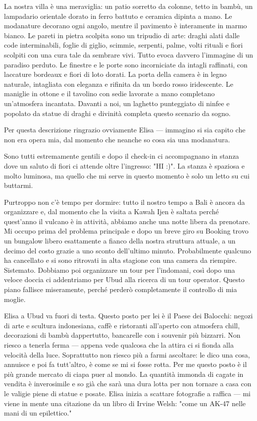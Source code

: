 La nostra villa è una meraviglia: un patio sorretto da colonne, tetto in bambù, un lampadario orientale dorato in ferro battuto e ceramica dipinta a mano. Le modanature decorano ogni angolo, mentre il pavimento è interamente in marmo bianco. Le pareti in pietra scolpita sono un tripudio di arte: draghi alati dalle code interminabili, foglie di giglio, scimmie, serpenti, palme, volti rituali e fiori scolpiti con una cura tale da sembrare vivi. Tutto evoca davvero l'immagine di un paradiso perduto. Le finestre e le porte sono incorniciate da intagli raffinati, con laccature bordeaux e fiori di loto dorati. La porta della camera è in legno naturale, intagliata con eleganza e rifinita da un bordo rosso iridescente. Le maniglie in ottone e il tavolino con sedie lavorate a mano completano un'atmosfera incantata. Davanti a noi, un laghetto punteggiato di ninfee e popolato da statue di draghi e divinità completa questo scenario da sogno.

Per questa descrizione ringrazio ovviamente Elisa — immagino si sia capito che non era opera mia, dal momento che neanche so cosa sia una modanatura.

Sono tutti estremamente gentili e dopo il check-in ci accompagnano in stanza dove un saluto di fiori ci attende oltre l'ingresso: "HI :)". La stanza è spaziosa e molto luminosa, ma quello che mi serve in questo momento è solo un letto su cui buttarmi.

Purtroppo non c'è tempo per dormire: tutto il nostro tempo a Bali è ancora da organizzare e, dal momento che la visita a Kawah Ijen è saltata perché quest'anno il vulcano è in attività, abbiamo anche una notte libera da prenotare. Mi occupo prima del problema principale e dopo un breve giro su Booking trovo un bungalow libero esattamente a fianco della nostra struttura attuale, a un decimo del costo grazie a uno sconto dell'ultimo minuto. Probabilmente qualcuno ha cancellato e si sono ritrovati in alta stagione con una camera da riempire. Sistemato. Dobbiamo poi organizzare un tour per l'indomani, così dopo una veloce doccia ci addentriamo per Ubud alla ricerca di un tour operator. Questo piano fallisce miseramente, perché perderò completamente il controllo di mia moglie.

Elisa a Ubud va fuori di testa. Questo posto per lei è il Paese dei Balocchi: negozi di arte e scultura indonesiana, caffè e ristoranti all'aperto con atmosfera chill, decorazioni di bambù dappertutto, bancarelle con i souvenir più bizzarri. Non riesco a tenerla ferma — appena vede qualcosa che la attira ci si fionda alla velocità della luce. Soprattutto non riesco più a farmi ascoltare: le dico una cosa, annuisce e poi fa tutt'altro, è come se mi si fosse rotta. Per me questo posto è il più grande mercato di ciapa puer al mondo. La quantità immonda di cagate in vendita è inverosimile e so già che sarà una dura lotta per non tornare a casa con le valigie piene di statue e posate. Elisa inizia a scattare fotografie a raffica — mi viene in mente una citazione da un libro di Irvine Welsh: "come un AK-47 nelle mani di un epilettico."

